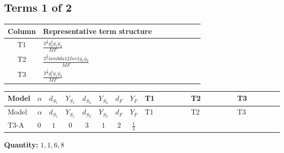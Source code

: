 \documentclass[8pt]{article}
\begin{document}
\begin{landscape}
\subsection*{Terms 1 of 2}
\begin{center}
\begin{tabular}{@{}c >{\raggedright\arraybackslash}p{0.82\linewidth}@{}}
\toprule
Column & Representative term structure \\
\midrule
T1 & \(\displaystyle \frac{3^{\frac{3}{4}} g_{2}^{2} \overline{y_{1}} \overline{y_{2}}}{MF}\) \\
\midrule
T2 & \(\displaystyle \frac{3^{\frac{3}{4}} lambda12Inv1 \overline{y_{1}} \overline{y_{2}}}{MF}\) \\
\midrule
T3 & \(\displaystyle \frac{3^{\frac{3}{4}} g_{1}^{2} \overline{y_{1}} \overline{y_{2}}}{MF}\) \\
\midrule
\bottomrule
\end{tabular}
\end{center}
\smallskip
\tiny
\begin{longtable}{@{}llcccccc >{\raggedright\arraybackslash}p{0.21\linewidth} >{\raggedright\arraybackslash}p{0.21\linewidth} >{\raggedright\arraybackslash}p{0.21\linewidth}@{}}
\toprule
Model & $\alpha$ & $d_{S_1}$ & $Y_{S_1}$ & $d_{S_2}$ & $Y_{S_2}$ & $d_F$ & $Y_F$ & T1 & T2 & T3 \\
\midrule
\endfirsthead
\toprule
Model & $\alpha$ & $d_{S_1}$ & $Y_{S_1}$ & $d_{S_2}$ & $Y_{S_2}$ & $d_F$ & $Y_F$ & T1 & T2 & T3 \\
\midrule
\endhead
T3-A & $0$ & $1$ & $0$ & $3$ & $1$ & $2$ & $\frac{1}{2}$ & \scriptsize\adjustbox{max width=\linewidth}{$\begin{gathered} - \frac{11 \cdot 3^{\frac{3}{4}} g_{2}^{2} \overline{y_{1}} \overline{y_{2}}}{8 MF}\end{gathered}$} & \scriptsize\adjustbox{max width=\linewidth}{$\begin{gathered} - \frac{3^{\frac{3}{4}} lambda12Inv1 \overline{y_{1}} \overline{y_{2}}}{6 MF}\end{gathered}$} & \scriptsize\adjustbox{max width=\linewidth}{$\begin{gathered} - \frac{3^{\frac{3}{4}} g_{1}^{2} \overline{y_{1}} \overline{y_{2}}}{8 MF}\end{gathered}$} \\
\midrule
\bottomrule
\end{longtable}
\clearpage
\noindent\textbf{Quantity: }$\mathrm{1,1,6,8}$\par\smallskip

\end{landscape}
\end{document}
